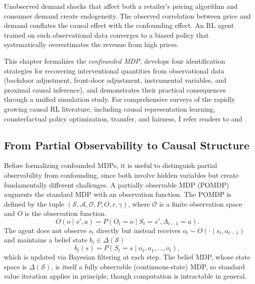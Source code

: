 Unobserved demand shocks that affect both a retailer's pricing algorithm and consumer demand create endogeneity. The observed correlation between price and demand conflates the causal effect with the confounding effect. An RL agent trained on such observational data converges to a biased policy that systematically overestimates the revenue from high prices.

This chapter formalizes the \textit{confounded MDP}, develops four identification strategies for recovering interventional quantities from observational data (backdoor adjustment, front-door adjustment, instrumental variables, and proximal causal inference), and demonstrates their practical consequences through a unified simulation study. For comprehensive surveys of the rapidly growing causal RL literature, including causal representation learning, counterfactual policy optimization, transfer, and fairness, I refer readers to \citet{deng2023causal} and \citet{dacostacunha2025unifying}.

\subsection{From Partial Observability to Causal Structure}
\label{subsec:pomdp_to_causal}

Before formalizing confounded MDPs, it is useful to distinguish partial observability from confounding, since both involve hidden variables but create fundamentally different challenges. A partially observable MDP (POMDP) augments the standard MDP with an observation function. The POMDP is defined by the tuple $(\mathcal{S}, \mathcal{A}, \mathcal{O}, P, O, r, \gamma)$, where $\mathcal{O}$ is a finite observation space and $O$ is the observation function.
\begin{equation}
O(o \mid s', a) = P(O_t = o \mid S_t = s', A_{t-1} = a).
\label{eq:pomdp_obs}
\end{equation}
The agent does not observe $s_t$ directly but instead receives $o_t \sim O(\cdot \mid s_t, a_{t-1})$ and maintains a belief state $b_t \in \Delta(\mathcal{S})$
\begin{equation}
b_t(s) = P(S_t = s \mid o_1, a_1, \ldots, o_t),
\label{eq:belief_state}
\end{equation}
which is updated via Bayesian filtering at each step. The belief MDP, whose state space is $\Delta(\mathcal{S})$, is itself a fully observable (continuous-state) MDP, so standard value iteration applies in principle, though computation is intractable in general.

